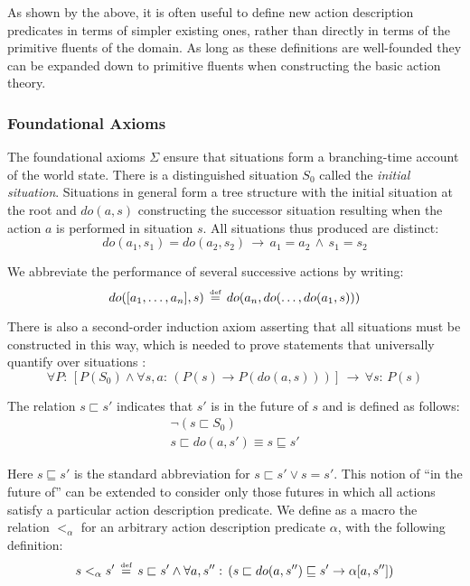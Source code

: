 As shown by the above, it is often useful to define new action description
predicates in terms of simpler existing ones, rather than directly
in terms of the primitive fluents of the domain. As long as these
definitions are well-founded they can be expanded down to primitive
fluents when constructing the basic action theory.


\subsubsection{Foundational Axioms}

The foundational axioms $\Sigma$ ensure that situations form a branching-time
account of the world state. There is a distinguished situation $S_{0}$
called the \emph{initial situation}. Situations in general form a
tree structure with the initial situation at the root and $do(a,s)$
constructing the successor situation resulting when the action $a$
is performed in situation $s$. All situations thus produced are distinct:\[
do(a_{1},s_{1})=do(a_{2},s_{2})\,\rightarrow\, a_{1}=a_{2}\,\wedge\, s_{1}=s_{2}\]


We abbreviate the performance of several successive actions by writing:\[
do([a_{1},\dots,a_{n}],s)\,\stackrel{\mbox{\tiny def}}{=}\, do(a_{n},do(\dots,do(a_{1},s)))\]


There is also a second-order induction axiom asserting that all situations
must be constructed in this way, which is needed to prove statements
that universally quantify over situations \citep{Reiter93proving}:\[
\forall P:\,\left[P(S_{0})\wedge\forall s,a:\,\left(P(s)\rightarrow P(do(a,s))\right)\right]\,\rightarrow\,\forall s:\, P(s)\]


The relation $s\sqsubset s'$ indicates that $s'$ is in the future
of $s$ and is defined as follows:\begin{gather*}
\neg(s\sqsubset S_{0})\\
s\sqsubset do(a,s')\equiv s\sqsubseteq s'\end{gather*}


Here $s\sqsubseteq s'$ is the standard abbreviation for $s\sqsubset s'\vee s=s'$.
This notion of {}``in the future of'' can be extended to consider
only those futures in which all actions satisfy a particular action
description predicate. We define as a macro the relation $<_{\alpha}$
for an arbitrary action description predicate $\alpha$, with the
following definition:\[
s<_{\alpha}s'\,\stackrel{\mbox{\tiny def}}{=}\, s\sqsubset s'\wedge\forall a,s'':\,\left(s\sqsubset do(a,s'')\sqsubseteq s'\rightarrow\alpha[a,s'']\right)\]


